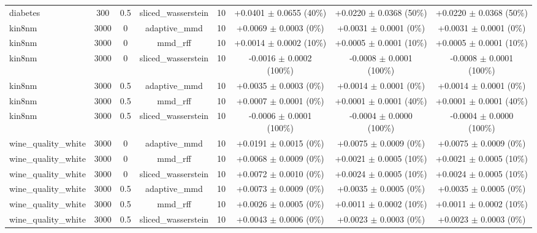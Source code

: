 \begin{table}[h]
\begin{adjustbox}{max width=\textwidth}
\begin{tabular}{lccccccc}
    diabetes & 300 & 0.5 & sliced\_wasserstein & 10 & +0.0401 $\pm$ 0.0655 (40\%) & +0.0220 $\pm$ 0.0368 (50\%) & +0.0220 $\pm$ 0.0368 (50\%) \\
    kin8nm & 3000 & 0 & adaptive\_mmd & 10 & +0.0069 $\pm$ 0.0003 (0\%) & +0.0031 $\pm$ 0.0001 (0\%) & +0.0031 $\pm$ 0.0001 (0\%) \\
    kin8nm & 3000 & 0 & mmd\_rff & 10 & +0.0014 $\pm$ 0.0002 (10\%) & +0.0005 $\pm$ 0.0001 (10\%) & +0.0005 $\pm$ 0.0001 (10\%) \\
    kin8nm & 3000 & 0 & sliced\_wasserstein & 10 & -0.0016 $\pm$ 0.0002 (100\%) & -0.0008 $\pm$ 0.0001 (100\%) & -0.0008 $\pm$ 0.0001 (100\%) \\
    kin8nm & 3000 & 0.5 & adaptive\_mmd & 10 & +0.0035 $\pm$ 0.0003 (0\%) & +0.0014 $\pm$ 0.0001 (0\%) & +0.0014 $\pm$ 0.0001 (0\%) \\
    kin8nm & 3000 & 0.5 & mmd\_rff & 10 & +0.0007 $\pm$ 0.0001 (0\%) & +0.0001 $\pm$ 0.0001 (40\%) & +0.0001 $\pm$ 0.0001 (40\%) \\
    kin8nm & 3000 & 0.5 & sliced\_wasserstein & 10 & -0.0006 $\pm$ 0.0001 (100\%) & -0.0004 $\pm$ 0.0000 (100\%) & -0.0004 $\pm$ 0.0000 (100\%) \\
    wine\_quality\_white & 3000 & 0 & adaptive\_mmd & 10 & +0.0191 $\pm$ 0.0015 (0\%) & +0.0075 $\pm$ 0.0009 (0\%) & +0.0075 $\pm$ 0.0009 (0\%) \\
    wine\_quality\_white & 3000 & 0 & mmd\_rff & 10 & +0.0068 $\pm$ 0.0009 (0\%) & +0.0021 $\pm$ 0.0005 (10\%) & +0.0021 $\pm$ 0.0005 (10\%) \\
    wine\_quality\_white & 3000 & 0 & sliced\_wasserstein & 10 & +0.0072 $\pm$ 0.0010 (0\%) & +0.0024 $\pm$ 0.0005 (10\%) & +0.0024 $\pm$ 0.0005 (10\%) \\
    wine\_quality\_white & 3000 & 0.5 & adaptive\_mmd & 10 & +0.0073 $\pm$ 0.0009 (0\%) & +0.0035 $\pm$ 0.0005 (0\%) & +0.0035 $\pm$ 0.0005 (0\%) \\
    wine\_quality\_white & 3000 & 0.5 & mmd\_rff & 10 & +0.0026 $\pm$ 0.0005 (0\%) & +0.0011 $\pm$ 0.0002 (10\%) & +0.0011 $\pm$ 0.0002 (10\%) \\
    wine\_quality\_white & 3000 & 0.5 & sliced\_wasserstein & 10 & +0.0043 $\pm$ 0.0006 (0\%) & +0.0023 $\pm$ 0.0003 (0\%) & +0.0023 $\pm$ 0.0003 (0\%) \\
    \bottomrule
  \end{tabular}
  \end{adjustbox}
\end{table}

